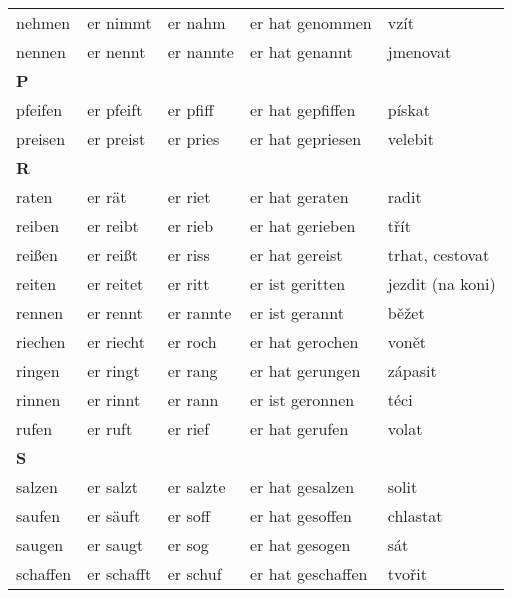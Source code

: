 \documentclass[a4paper,12pt]{report}
\begin{document}
\begin{longtable}{ | m{2cm} | m{2.5cm} | m{2.5cm} | m{4cm} | m{3cm} | }
    nehmen      & er nimmt      & er nahm      & er hat genommen    & vzít               \\
    nennen      & er nennt      & er nannte    & er hat genannt     & jmenovat           \\
    \hline
    \textbf{P}  &               &              &                    &                    \\
    pfeifen     & er pfeift     & er pfiff     & er hat gepfiffen   & pískat             \\
    preisen     & er preist     & er pries     & er hat gepriesen   & velebit            \\
    \hline
    \textbf{R}  &               &              &                    &                    \\
    raten       & er rät        & er riet      & er hat geraten     & radit              \\
    reiben      & er reibt      & er rieb      & er hat gerieben    & třít               \\
    reißen      & er reißt      & er riss      & er hat gereist     & trhat, cestovat    \\
    reiten      & er reitet     & er ritt      & er ist geritten    & jezdit (na koni)   \\
    rennen      & er rennt      & er rannte    & er ist gerannt     & běžet              \\
    riechen     & er riecht     & er roch      & er hat gerochen    & vonět              \\
    ringen      & er ringt      & er rang      & er hat gerungen    & zápasit            \\
    rinnen      & er rinnt      & er rann      & er ist geronnen    & téci               \\
    rufen       & er ruft       & er rief      & er hat gerufen     & volat              \\
    \hline
    \textbf{S}  &               &              &                    &                    \\
    salzen      & er salzt      & er salzte    & er hat gesalzen    & solit              \\
    saufen      & er säuft      & er soff      & er hat gesoffen    & chlastat           \\
    saugen      & er saugt      & er sog       & er hat gesogen     & sát                \\
    schaffen    & er schafft    & er schuf     & er hat geschaffen  & tvořit             \\

\end{longtable}
\end{document}
